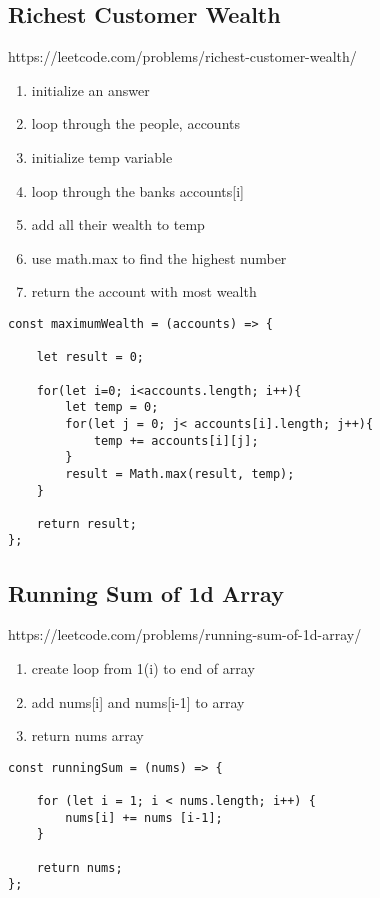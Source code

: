 \documentclass[10pt]{article}
\begin{document}
\medskip %

\pagebreak
\medskip %
\subsection{Richest Customer Wealth}
https://leetcode.com/problems/richest-customer-wealth/

\begin{enumerate}
	\item initialize an answer
	\item loop through the people, accounts
	\item initialize temp variable
	\item loop through the banks accounts[i]
	\item add all their wealth to temp 
	\item use math.max to find the highest number 
	\item return the account with most wealth
\end{enumerate}

\begin{lstlisting}[title=Solution maximumWealth, captionpos=t]
const maximumWealth = (accounts) => {

    let result = 0;

    for(let i=0; i<accounts.length; i++){
        let temp = 0;
        for(let j = 0; j< accounts[i].length; j++){
            temp += accounts[i][j];
        }
        result = Math.max(result, temp);
    }
    
    return result;
};
\end{lstlisting}

\medskip %

\pagebreak
\medskip %
\subsection{Running Sum of 1d Array}
https://leetcode.com/problems/running-sum-of-1d-array/

\begin{enumerate}
	\item create loop from 1(i) to end of array 
	\item add nums[i] and nums[i-1] to array
	\item return nums array
\end{enumerate}

\begin{lstlisting}[title=Solution runningSum, captionpos=t]
const runningSum = (nums) => {
    
    for (let i = 1; i < nums.length; i++) {
        nums[i] += nums [i-1];
    }

    return nums;
};
\end{lstlisting}
\end{document}
